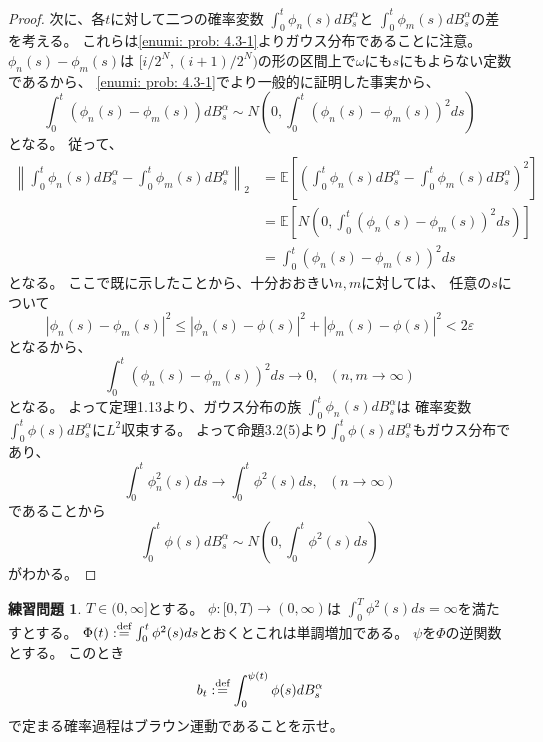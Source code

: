 \documentclass[uplatex]{jsarticle}
\theoremstyle{definition}
\newtheorem{prob}[prob]{練習問題}
\def\ep{\varepsilon}
\def\E{\mathbb{E}}
\def\dfn{:\overset{\mbox{{\scriptsize def}}}{=}}
\begin{document}
\begin{proof}
  次に、各\(t\)に対して二つの確率変数
  \(\int_0^t\phi_n(s)dB_s^\alpha\)と
  \(\int_0^t\phi_m(s)dB_s^\alpha\)の差を考える。
  これらは\ref{enumi: prob: 4.3-1}よりガウス分布であることに注意。
  \(\phi_n(s)-\phi_m(s)\)は
  \([i/2^N,(i+1)/2^N)\)の形の区間上で\(\omega\)にも\(s\)にもよらない定数であるから、
  \ref{enumi: prob: 4.3-1}でより一般的に証明した事実から、
  \[
  \int_0^t\left( \phi_n(s) - \phi_m(s)\right) dB_s^\alpha
  \sim N\left( 0, \int_0^t\left( \phi_n(s) - \phi_m(s)\right)^2 ds\right)
  \]
  となる。
  従って、
  \begin{align*}
    \left\| \int_0^t\phi_n(s)dB_s^\alpha - \int_0^t\phi_m(s)dB_s^\alpha \right\|_2
    &= \E \left[ \left(
    \int_0^t\phi_n(s)dB_s^\alpha - \int_0^t\phi_m(s)dB_s^\alpha
    \right)^2 \right] \\
    &= \E \left[
    N\left( 0, \int_0^t\left( \phi_n(s) - \phi_m(s)\right)^2 ds\right)
    \right] \\
    &= \int_0^t\left( \phi_n(s) - \phi_m(s)\right)^2 ds
  \end{align*}
  となる。
  ここで既に示したことから、十分おおきい\(n,m\)に対しては、
  任意の\(s\)について
  \[
  \left| \phi_n(s)-\phi_m(s) \right|^2
  \leq \left| \phi_n(s)-\phi(s) \right|^2
  + \left| \phi_m(s)-\phi(s) \right|^2
  < 2\ep
  \]
  となるから、
  \[
  \int_0^t\left( \phi_n(s) - \phi_m(s)\right)^2 ds \to 0
  , \ \ \ (n,m \to \infty)
  \]
  となる。
  よって定理1.13より、ガウス分布の族
  \(\int_0^t\phi_n(s)dB_s^\alpha\)は
  確率変数\(\int_0^t\phi(s)dB_s^\alpha\)に\(L^2\)収束する。
  よって命題3.2(5)より\(\int_0^t\phi(s)dB_s^\alpha\)もガウス分布であり、
  \[
  \int_0^t\phi_n^2(s)ds \to \int_0^t\phi^2(s)ds, \ \ \ (n\to \infty)
  \]
  であることから
  \[
  \int_0^t\phi(s)dB_s^\alpha \sim N\left( 0, \int_0^t\phi^2(s)ds\right)
  \]
  がわかる。
\end{proof}








\begin{prob}\label{prob: 4.4}
  \(T\in (0,\infty]\)とする。
  \(\phi:[0,T) \to (0,\infty)\)は
  \(\int_0^T\phi^2(s)ds = \infty\)を満たすとする。
  \(\Phi(t) \dfn \int_0^t\phi^2(s)ds\)とおくとこれは単調増加である。
  \(\psi\)を\(\Phi\)の逆関数とする。
  このとき
  \[
  b_t \dfn \int_0^{\psi(t)}\phi(s)dB_s^\alpha
  \]
  で定まる確率過程はブラウン運動であることを示せ。
\end{prob}
\end{document}
